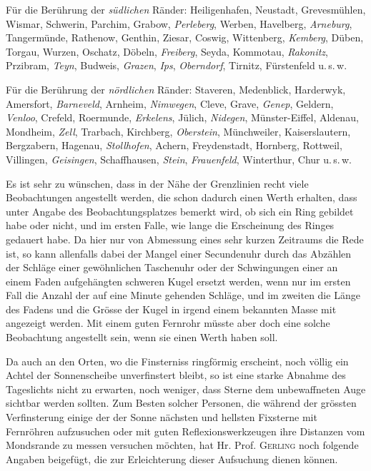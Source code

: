 Für die Berührung der \emph{südlichen} Ränder: Heiligenhafen, Neustadt, Grevesmühlen, Wismar, Schwerin, Parchim, Grabow, \emph{Perleberg}, Werben, Havelberg, \emph{Arneburg}, Tangermünde, Rathenow, Genthin, Ziesar, Coswig, Wittenberg, \emph{Kemberg}, Düben, Torgau, Wurzen, Oschatz, Döbeln, \emph{Freiberg}, Seyda, Kommotau, \emph{Rakonitz}, Przibram, \emph{Teyn}, Budweis, \emph{Grazen}, \emph{Ips}, \emph{Oberndorf}, Tirnitz, Fürstenfeld u.\,s.\,w.

Für die Berührung der \emph{nördlichen} Ränder: Staveren, Medenblick, Harderwyk, Amersfort, \emph{Barneveld}, Arnheim, \emph{Nimwegen}, Cleve, Grave, \emph{Genep}, Geldern, \emph{Venloo}, Crefeld, Roermunde, \emph{Erkelens}, Jülich, \emph{Nidegen}, Münster-Eiffel, Aldenau, Mondheim, \emph{Zell}, Trarbach, Kirchberg, \emph{Oberstein}, Münchweiler,  Kaiserslautern, Bergzabern, Hagenau, \emph{Stollhofen}, Achern, Freydenstadt, Hornberg, Rottweil, Villingen, \emph{Geisingen}, Schaffhausen, \emph{Stein}, \emph{Frauenfeld}, Winterthur, Chur u.\,s.\,w.

Es ist sehr zu wünschen, dass in der Nähe der Grenzlinien recht viele Beobachtungen angestellt werden, die schon dadurch einen Werth erhalten, dass unter Angabe des Beobachtungsplatzes bemerkt wird, ob sich ein Ring gebildet habe oder nicht, und im ersten Falle, wie lange die Erscheinung des Ringes gedauert habe. Da hier nur von Abmessung eines sehr kurzen Zeitraums die Rede ist, so kann allenfalls dabei der Mangel einer Secundenuhr durch das Abzählen der Schläge einer gewöhnlichen Taschenuhr oder der Schwingungen einer an einem Faden aufgehängten schweren Kugel ersetzt werden, wenn nur im ersten Fall die Anzahl der auf eine Minute gehenden Schläge, und im zweiten die Länge des Fadens und die Grösse der Kugel in irgend einem bekannten Masse mit angezeigt werden. Mit einem guten Fernrohr müsste aber doch eine solche Beobachtung angestellt sein, wenn sie einen Werth haben soll.

Da auch an den Orten, wo die Finsterniss ringförmig erscheint, noch völlig ein Achtel der Sonnenscheibe unverfinstert bleibt, so ist eine starke Abnahme des Tageslichts nicht zu erwarten, noch weniger, dass Sterne dem unbewaffneten Auge sichtbar werden sollten. Zum Besten solcher Personen, die während der grössten Verfinsterung einige der der Sonne nächsten und hellsten Fixsterne mit Fernröhren aufzusuchen oder mit guten Reflexionswerkzeugen ihre Distanzen vom Mondsrande zu messen versuchen möchten, hat Hr. Prof. \textsc{Gerling} noch folgende Angaben beigefügt, die zur Erleichterung dieser Aufsuchung dienen können.

